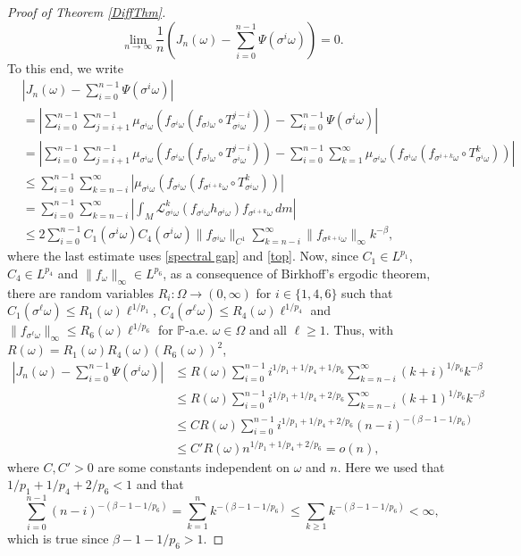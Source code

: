 \documentclass[11pt,reqno,a4paper]{article}
\theoremstyle{special}
\def\om{\omega}
\begin{document}
\begin{proof}[Proof of Theorem \ref{DiffThm}]
$$
\lim_{n\to\infty}\frac1n\left(J_n(\om)-\sum_{i=0}^{n-1}\Psi(\sigma^i\om)\right)=0.
$$
To this end, we write
\[
\begin{split}
&\left|J_n(\om)-\sum_{i=0}^{n-1}\Psi(\sigma^i\om)\right| \\
&=
\left|\sum_{i=0}^{n-1} \sum_{j=i+1}^{n-1}\mu_{\sigma^i\om}(f_{\sigma^i\om}(f_{\sigma^j\om}\circ T_{\sigma^i\om}^{j-i}))-\sum_{i=0}^{n-1}\Psi(\sigma^i\om)\right| \\
&=
\left|\sum_{i=0}^{n-1} \sum_{j=i+1}^{n-1}\mu_{\sigma^i\om}(f_{\sigma^i\om}(f_{\sigma^j\om}\circ T_{\sigma^i\om}^{j-i}))-\sum_{i=0}^{n-1}\sum_{k=1}^\infty \mu_{\sigma^i\om}(f_{\sigma^i\om}(f_{\sigma^{i+k}\om}\circ T_{\sigma^i\om}^{k}))\right| \\
&\leq\sum_{i=0}^{n-1}\sum_{k=n-i}^\infty\left|\mu_{\sigma^i\om}(f_{\sigma^i\om}(f_{\sigma^{i+k}\om}\circ T_{\sigma^{i}\om}^{k}))\right| \\
&=\sum_{i=0}^{n-1}\sum_{k=n-i}^\infty\left|\int_{M}\mathcal L_{\sigma^i\om}^k(f_{\sigma^i\om} h_{\sigma^i\om})f_{\sigma^{i+k}\om}\, dm\right| \\
&\leq 2\sum_{i=0}^{n-1}C_1(\sigma^i\om)C_4(\sigma^i\om)\|f_{\sigma^i\om}\|_{C^1}\sum_{k=n-i}^\infty \|f_{\sigma^{k+i}\om}\|_\infty k^{-\beta},
\end{split}
\]
where  the last estimate uses \eqref{spectral gap} and \eqref{top}.
Now, since $C_1\in L^{p_1}$, $C_4\in L^{p_4}$ and $\|f_\om\|_\infty\in L^{p_6}$, as a consequence of Birkhoff's ergodic theorem, 
there are random
variables $R_i\colon \Omega \to (0, \infty)$ for $i\in \{1, 4, 6\}$ such that $C_1(\sigma^\ell\om)\leq R_1(\om)\ell^{1/p_1}$,
$C_4(\sigma^\ell\om)\leq R_4(\om)\ell^{1/p_4}$ and $\|f_{\sigma^\ell\om}\|_\infty\leq R_6(\om)\ell^{1/p_6}$ for $\mathbb P$-a.e. $\om \in \Omega$ and all $\ell\geq 1$. Thus, with $R(\om)=R_1(\om)R_4(\om)(R_6(\om))^2$,
\[
\begin{split}
\left|J_n(\om)-\sum_{i=0}^{n-1}\Psi(\sigma^i\om)\right| &\leq R(\om)\sum_{i=0}^{n-1}i^{1/p_1+1/p_4+1/p_6}\sum_{k=n-i}^\infty (k+i)^{1/p_6}k^{-\beta} \\
&\leq R(\om)\sum_{i=0}^{n-1}i^{1/p_1+1/p_4+2/p_6}
\sum_{k=n-i}^\infty (k+1)^{1/p_6}k^{-\beta} \\
&\leq C R(\om)\sum_{i=0}^{n-1}i^{1/p_1+1/p_4+2/p_6}(n-i)^{-(\beta-1-1/p_6)} \\
&\leq C'R(\om)n^{1/p_1+1/p_4+2/p_6}=o(n),
\end{split}
\]
where $C, C'>0$ are some constants independent on $\om$ and $n$.
Here we used that $1/p_1+1/p_4+2/p_6<1$ and that
$$
\sum_{i=0}^{n-1}(n-i)^{-(\beta-1-1/p_6)}=\sum_{k=1}^{n}k^{-(\beta-1-1/p_6)}\leq \sum_{k\geq  1}k^{-(\beta-1-1/p_6)}<\infty,
$$
which is true since $\beta-1-1/p_6>1$.



\end{proof}
\end{document}

